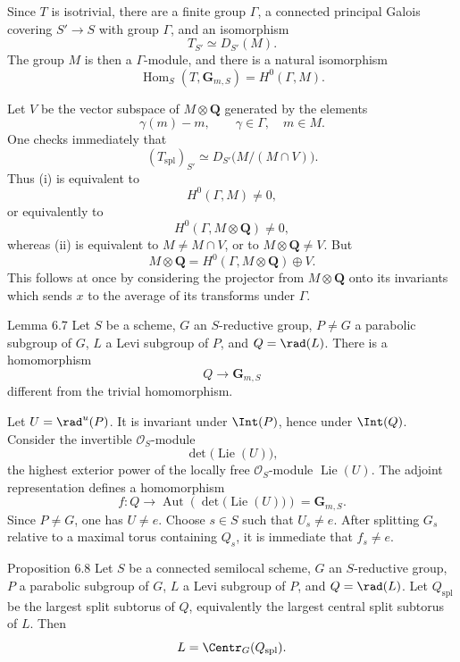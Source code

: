Since \(T\) is isotrivial, there are a finite group \(\Gamma\), a
connected principal Galois covering \(S'\to S\) with group
\(\Gamma\), and an isomorphism
\[
 T_{S'}\simeq D_{S'}(M).
\]
The group \(M\) is then a \(\Gamma\)-module, and there is a natural
isomorphism
\[
 \operatorname{Hom}_S(T,\mathbf G_{m,S})
   =H^0(\Gamma,M).
\]

Let \(V\) be the vector subspace of \(M\otimes\mathbf Q\) generated
by the elements
\[
 \gamma(m)-m,\qquad \gamma\in\Gamma,\quad m\in M.
\]
One checks immediately that
\[
 (T_{\mathrm{spl}})_{S'}
   \simeq D_{S'}\bigl(M/(M\cap V)\bigr).
\]
Thus \textup{(i)} is equivalent to
\[
 H^0(\Gamma,M)\ne0,
\]
or equivalently to
\[
 H^0(\Gamma,M\otimes\mathbf Q)\ne0,
\]
whereas \textup{(ii)} is equivalent to \(M\ne M\cap V\), or to
\(M\otimes\mathbf Q\ne V\).  But
\[
 M\otimes\mathbf Q
 =H^0(\Gamma,M\otimes\mathbf Q)\oplus V.
\]
This follows at once by considering the projector from
\(M\otimes\mathbf Q\) onto its invariants which sends \(x\) to the
average of its transforms under \(\Gamma\).

\begin{sgastatement}{Lemma 6.7}
Let \(S\) be a scheme, \(G\) an \(S\)-reductive group, \(P\ne G\) a
parabolic subgroup of \(G\), \(L\) a Levi subgroup of \(P\), and
\(Q=\rad(L)\).  There is a homomorphism
\[
 Q\longrightarrow\mathbf G_{m,S}
\]
different from the trivial homomorphism.
\end{sgastatement}

Let \(U=\rad^u(P)\).  It is invariant under \(\Int(P)\), hence under
\(\Int(Q)\).  Consider the invertible \(\mathcal O_S\)-module
\[
 \det\bigl(\operatorname{Lie}(U)\bigr),
\]
the highest exterior power of the locally free
\(\mathcal O_S\)-module \(\operatorname{Lie}(U)\).  The adjoint
representation defines a homomorphism
\[
 f:Q\longrightarrow
 \operatorname{Aut}\!\left(\det\bigl(\operatorname{Lie}(U)\bigr)\right)
 =\mathbf G_{m,S}.
\]
Since \(P\ne G\), one has \(U\ne e\).  Choose \(s\in S\) such that
\(U_s\ne e\).  After splitting \(G_s\) relative to a maximal torus
containing \(Q_s\), it is immediate that \(f_s\ne e\).

\begin{sgastatement}{Proposition 6.8}
Let \(S\) be a connected semilocal scheme, \(G\) an \(S\)-reductive
group, \(P\) a parabolic subgroup of \(G\), \(L\) a Levi subgroup of
\(P\), and \(Q=\rad(L)\).  Let \(Q_{\mathrm{spl}}\) be the largest
split subtorus of \(Q\), equivalently the largest central split
subtorus of \(L\).  Then
\[
 L=\Centr_G(Q_{\mathrm{spl}}).
\]
\end{sgastatement}

